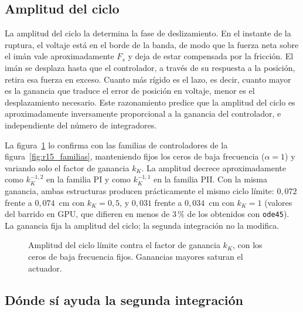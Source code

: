\subsection{Amplitud del ciclo}

La amplitud del ciclo la determina la fase de deslizamiento. En el instante de la ruptura, el voltaje está en el borde de la banda, de modo que la fuerza neta sobre el imán vale aproximadamente $F_s$ y deja de estar compensada por la fricción. El imán se desplaza hasta que el controlador, a través de su respuesta a la posición, retira esa fuerza en exceso. Cuanto más rígido es el lazo, es decir, cuanto mayor es la ganancia que traduce el error de posición en voltaje, menor es el desplazamiento necesario. Este razonamiento predice que la amplitud del ciclo es aproximadamente inversamente proporcional a la ganancia del controlador, e independiente del número de integradores.

La figura~\ref{fig:ganancia} lo confirma con las familias de controladores de la figura~\ref{fig:r15_familias}, manteniendo fijos los ceros de baja frecuencia ($\alpha=1$) y variando solo el factor de ganancia $k_K$. La amplitud decrece aproximadamente como $k_K^{-1{,}2}$ en la familia PI y como $k_K^{-1{,}1}$ en la familia PII. Con la misma ganancia, ambas estructuras producen prácticamente el mismo ciclo límite: $0{,}072$ frente a $0{,}074$~cm con $k_K=0{,}5$, y $0{,}031$ frente a $0{,}034$~cm con $k_K=1$ (valores del barrido en GPU, que difieren en menos de 3\,\% de los obtenidos con \texttt{ode45}). La ganancia fija la amplitud del ciclo; la segunda integración no la modifica.

\begin{figure}[ht]
    \centering
    
    \caption[Ciclo límite contra la ganancia]{Amplitud del ciclo límite contra el factor de ganancia $k_K$, con los ceros de baja frecuencia fijos. Ganancias mayores saturan el actuador.}
    \label{fig:ganancia}
\end{figure}

\subsection{Dónde sí ayuda la segunda integración}

